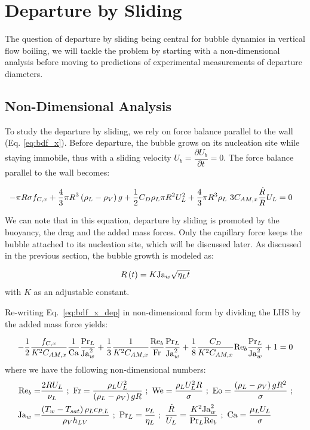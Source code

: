 \section{Departure by Sliding}
\label{sec:departure}

The question of departure by sliding being central for bubble dynamics in vertical flow boiling, we will tackle the problem by starting with a non-dimensional analysis before moving to predictions of experimental measurements of departure diameters.

\subsection{Non-Dimensional Analysis}\label{subsec:adim_dep}

To study the departure by sliding, we rely on force balance parallel to the wall (Eq. \ref{eq:bdf_x}). Before departure, the bubble grows on its nucleation site while staying immobile, thus with a sliding velocity $U_{b} = \dfrac{ \partial U_{b}}{\partial t} =0$. The force balance parallel to the wall becomes:

\begin{align}
- \pi R\sigma f_{C,x} + \frac{4}{3}\pi R^{3}\left( \rho_{L}-\rho_{V} \right)g &+ \frac{1}{2}C_{D}\rho_{L}\pi R^{2} U_{L}^{2} + \frac{4}{3}\pi R^{3}\rho_{L}~3C_{AM,x}\frac{\dot{R}}{R}U_{L} = 0
\label{eq:bdf_x_dep}
\end{align}


We can note that in this equation, departure by sliding is promoted by the buoyancy, the drag and the added mass forces. Only the capillary force keeps the bubble attached to its nucleation site, which will be discussed later.
As discussed in the previous section, the bubble growth is modeled as:

\begin{equation}
R\left( t \right) = K\mathrm{Ja}_{w} \sqrt{\eta_{L}t}
\end{equation}
with $K$ as an adjustable constant.

\npar
Re-writing Eq.~\ref{eq:bdf_x_dep} in non-dimensional form by dividing the LHS by the added mass force yields:

\begin{equation}
-\frac{1}{2}\frac{f_{C,x}}{K^{2}C_{AM,x}}\frac{1}{\mathrm{Ca}}\frac{\mathrm{Pr}_{L}}{\mathrm{Ja}_{w}^{2}} +  \frac{1}{3}\frac{1}{K^{2}C_{AM,x}}\frac{\mathrm{Re}_{b}}{\mathrm{Fr}}\frac{\mathrm{Pr}_{L}}{\mathrm{Ja}_{w}^{2}} + \frac{1}{8}\frac{C_{D}}{K^{2}C_{AM,x}}\mathrm{Re}_{b}\frac{\mathrm{Pr}_{L}}{\mathrm{Ja}_{w}^{2}} +1 =0
\label{eq:adim_dep}
\end{equation}
where we have the following non-dimensional numbers:
\begin{align}
\nonumber \Re_{b} =& \frac{2RU_{L}}{\nu_{L}}\ ;\ \Fr=\frac{\rho_{L}U_{L}^{2}}{\parth{\rho_{L}-\rho_{V}}g R}\ ;\ \We=\frac{\rho_{L}U_{L}^{2}R}{\sigma}\ ; \ \Eo=\frac{\parth{\rho_{L}-\rho_{V}}g R^{2}}{\sigma}\ ;\\
%
\nonumber \Ja_{w}=&\frac{\parth{T_{w}-T_{sat}}\rho_{L} c_{P,L}}{\rho_{V} h_{LV}}\ ;\ \Pr_{L}=\frac{\nu_{L}}{\eta_{L}}\ ;\ \frac{\dot{R}}{U_{L}}=\frac{K^{2}\Ja_{w}^{2}}{\Pr_{L} \Re_{b}}\ ;\ \Ca=\frac{\mu_{L}U_{L}}{\sigma}
\end{align}


